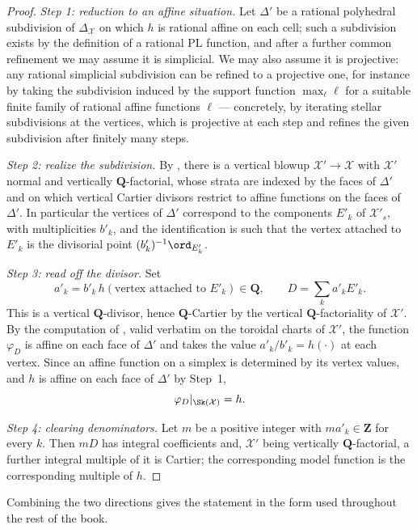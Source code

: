 \begin{proof}
\emph{Step 1: reduction to an affine situation.} Let $\Delta'$ be a
rational polyhedral subdivision of $\Delta_{\mathcal X}$ on which $h$ is
rational affine on each cell; such a subdivision exists by the definition of
a rational PL function, and after a further common refinement we may assume
it is simplicial. We may also assume it is projective: any rational
simplicial subdivision can be refined to a projective one, for instance by
taking the subdivision induced by the support function
$\max_\ell\ell$ for a suitable finite family of rational affine functions
$\ell$ --- concretely, by iterating stellar subdivisions at the vertices,
which is projective at each step and refines the given subdivision after
finitely many steps.

\emph{Step 2: realize the subdivision.} By
, there is a vertical blowup
$\mathcal X'\to\mathcal X$ with $\mathcal X'$ normal and vertically
$\mathbf Q$-factorial, whose strata are indexed by the faces of
$\Delta'$ and on which vertical Cartier divisors restrict to affine
functions on the faces of $\Delta'$. In particular the vertices of
$\Delta'$ correspond to the components $E'_k$ of $\mathcal X'_s$, with
multiplicities $b'_k$, and the identification is such that the vertex
attached to $E'_k$ is the divisorial point $(b'_k)^{-1}\ord_{E'_k}$.

\emph{Step 3: read off the divisor.} Set
\[
 a'_k=b'_k\,h(\text{vertex attached to }E'_k)\in\mathbf Q,
 \qquad D=\sum_ka'_kE'_k .
\]
This is a vertical $\mathbf Q$-divisor, hence $\mathbf Q$-Cartier by the
vertical $\mathbf Q$-factoriality of $\mathcal X'$. By the computation
of , valid verbatim on the toroidal charts
of $\mathcal X'$, the function $\varphi_D$ is affine on each face of
$\Delta'$ and takes the value $a'_k/b'_k=h(\cdot)$ at each vertex. Since
an affine function on a simplex is determined by its vertex values, and
$h$ is affine on each face of $\Delta'$ by Step~1,
\[
 \varphi_D|_{\Sk(\mathcal X)}=h .
\]

\emph{Step 4: clearing denominators.} Let $m$ be a positive integer with
$ma'_k\in\mathbf Z$ for every $k$. Then $mD$ has integral coefficients
and, $\mathcal X'$ being vertically $\mathbf Q$-factorial, a further
integral multiple of it is Cartier; the corresponding model function is
the corresponding multiple of $h$.
\end{proof}

Combining the two directions gives the statement in the form used
throughout the rest of the book.

